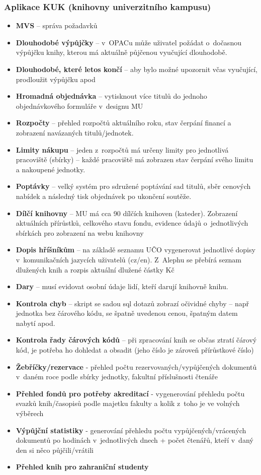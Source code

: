 \documentclass[
	11pt, oneside, printed, draft, 
	table,   %
	lof,     %
	lot     %
]{fithesis3}
\newcommand{\bold}[1]{\textbf{#1}}
\begin{document}
{\subsubsection{Aplikace KUK (knihovny univerzitního kampusu)}
\begin{itemize}
\item \bold{MVS} – správa požadavků
\item \bold{Dlouhodobé výpůjčky} – v~OPACu může uživatel požádat o~dočasnou výpůjčku knihy, kterou má aktuálně půjčenou vyučující dlouhodobě.
\item \bold{Dlouhodobé, které letos končí} – aby bylo možné upozornit včas vyučující, prodloužit výpůjčku apod
\item \bold{Hromadná objednávka} – vytisknout více titulů do jednoho objednávkového formuláře v~designu MU
\item \bold{Rozpočty} – přehled rozpočtů aktuálního roku, stav čerpání financí a zobrazení navázaných titulů/jednotek.
\item \bold{Limity nákupu} – jeden z~rozpočtů má určeny limity pro jednotlivá pracoviště (sbírky) – každé pracoviště má zobrazen stav čerpání svého limitu a nakoupené jednotky.
\item \bold{Poptávky} – velký systém pro sdružené poptávání sad titulů, sběr cenových nabídek a následný tisk objednávek po ukončení soutěže.
\item \bold{Dílčí knihovny} – MU má cca 90 dílčích knihoven (kateder). Zobrazení aktuálních přírůstků, celkového stavu fondu, evidence údajů o~jednotlivých sbírkách pro zobrazení na webu knihovny
\item \bold{Dopis hříšníkům} – na základě seznamu UČO vygenerovat jednotlivé dopisy v~komunikačních jazycích uživatelů (cz/en). Z~Alephu se přebírá seznam dlužených knih a rozpis aktuální dlužené částky Kč
\item \bold{Dary} – musí evidovat osobní údaje lidí, kteří darují knihovně knihu.
\item \bold{Kontrola chyb} – skript se sadou sql dotazů zobrazí očividné chyby – např jednotka bez čárového kódu, se špatně uvedenou cenou, špatným datem nabytí apod.
\item \bold{Kontrola řady čárových kódů} – při zpracování knih se občas ztratí čárový kód, je potřeba ho dohledat a obsadit (jeho číslo je zároveň přírůstkové číslo)
\item \bold{Žebříčky/rezervace} - přehled počtu rezervovaných/vypůjčených dokumentů v~daném roce podle sbírky jednotky, fakultní příslušnosti čtenáře
\item \bold{Přehled fondů pro potřeby akreditací} - vygenerování přehledu počtu svazků knih/časopisů podle majetku fakulty a kolik z~toho je ve volných výběrech
\item \bold{Výpůjční statistiky} - generování přehledu počtu vypůjčených/vrácených dokumentů po hodinách v~jednotlivých dnech + počet čtenářů, kteří v~daný den si něco půjčili/vrátili
\item \bold{Přehled knih pro zahraniční studenty}
\end{itemize}

}
\end{document}
